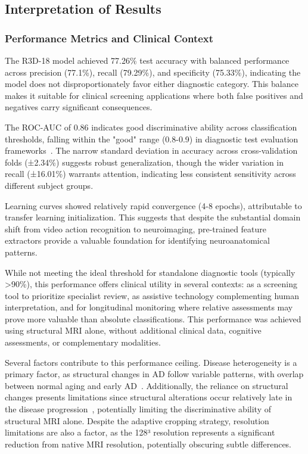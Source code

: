 \documentclass[11pt, a4paper]{article}
\begin{document}
\subsection{Interpretation of Results}

\subsubsection{Performance Metrics and Clinical Context}

The R3D-18 model achieved 77.26\% test accuracy with balanced performance across precision (77.1\%), recall (79.29\%), and specificity (75.33\%), indicating the model does not disproportionately favor either diagnostic category. This balance makes it suitable for clinical screening applications where both false positives and negatives carry significant consequences.

The ROC-AUC of 0.86 indicates good discriminative ability across classification thresholds, falling within the "good" range (0.8-0.9) in diagnostic test evaluation frameworks~\cite{mandrekar2010receiver}. The narrow standard deviation in accuracy across cross-validation folds (±2.34\%) suggests robust generalization, though the wider variation in recall (±16.01\%) warrants attention, indicating less consistent sensitivity across different subject groups.

Learning curves showed relatively rapid convergence (4-8 epochs), attributable to transfer learning initialization. This suggests that despite the substantial domain shift from video action recognition to neuroimaging, pre-trained feature extractors provide a valuable foundation for identifying neuroanatomical patterns.

While not meeting the ideal threshold for standalone diagnostic tools (typically >90\%), this performance offers clinical utility in several contexts: as a screening tool to prioritize specialist review, as assistive technology complementing human interpretation, and for longitudinal monitoring where relative assessments may prove more valuable than absolute classifications. This performance was achieved using structural MRI alone, without additional clinical data, cognitive assessments, or complementary modalities.

Several factors contribute to this performance ceiling. Disease heterogeneity is a primary factor, as structural changes in AD follow variable patterns, with overlap between normal aging and early AD~\cite{vemuri2010role}. Additionally, the reliance on structural changes presents limitations since structural alterations occur relatively late in the disease progression~\cite{jack2013tracking}, potentially limiting the discriminative ability of structural MRI alone. Despite the adaptive cropping strategy, resolution limitations are also a factor, as the 128³ resolution represents a significant reduction from native MRI resolution, potentially obscuring subtle differences.
\end{document}
